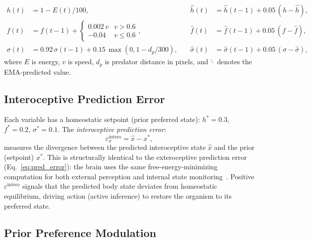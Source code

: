 \documentclass[11pt,a4paper]{article}
\begin{document}
\begin{equation}\label{eq:allostasis}
\boxed{
\begin{aligned}
  h(t) &= 1 - E(t)/100,  &\quad
  \hat{h}(t) &= \hat{h}(t{-}1) + 0.05\,(h - \hat{h}), \\
  f(t) &= f(t{-}1) + \begin{cases}
    0.002\,v & v > 0.6 \\
    -0.04    & v \leq 0.6
  \end{cases}, &\quad
  \hat{f}(t) &= \hat{f}(t{-}1) + 0.05\,(f - \hat{f}), \\
  \sigma(t) &= 0.92\,\sigma(t{-}1)
    + 0.15\,\max(0, 1{-}d_p/300), &\quad
  \hat{\sigma}(t) &= \hat{\sigma}(t{-}1) + 0.05\,(\sigma - \hat{\sigma}),
\end{aligned}
}
\end{equation}
where $E$ is energy, $v$ is speed, $d_p$ is predator distance in pixels,
and $\hat{\cdot}$ denotes the EMA-predicted value.

\subsection{Interoceptive Prediction Error}

Each variable has a homeostatic setpoint (prior preferred state):
$h^* = 0.3$, $f^* = 0.2$, $\sigma^* = 0.1$.
The \emph{interoceptive prediction error}:
\begin{equation}\label{eq:allo_error}
  \varepsilon_x^\text{intero} = \hat{x} - x^*,
\end{equation}
measures the divergence between the predicted interoceptive state $\hat{x}$
and the prior (setpoint) $x^*$.
This is structurally identical to the exteroceptive prediction error
(Eq.~\ref{eq:pred_error}): the brain uses the same free-energy-minimizing
computation for both external perception and internal state
monitoring~\cite{seth2016}.
Positive $\varepsilon^\text{intero}$ signals that the predicted body state
deviates from homeostatic equilibrium, driving action (active inference) to
restore the organism to its preferred state.

\subsection{Prior Preference Modulation}
\end{document}
